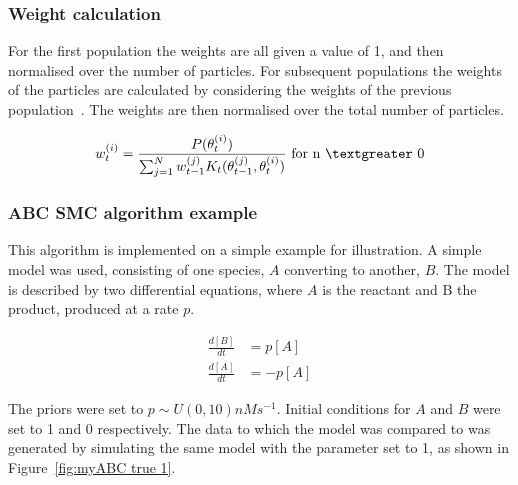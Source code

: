 \subsubsection{Weight calculation}
\label{sec:weight}
For the first population the weights are all given a value of 1, and then normalised over the number of particles. For subsequent populations the weights of the particles are calculated by considering the weights of the previous population~\autocite{Toni:2009tr}. The weights are then normalised over the total number of particles. 


\begin{align}
w_{t}^{(i)} = \frac{P(\theta_{t}^{(i)})}{\sum_{j=1}^N w_{t-1}^{(j)} K_{t}(\theta_{t-1}^{(j)}, \theta_{t}^{(i)})} \text{ for n $\textgreater$  0}
\end{align}
	
	
\subsubsection{ABC SMC algorithm example}	
This algorithm is implemented on a simple example for illustration. A simple model was used, consisting of one species, $A$ converting to another, $B$. The model is described by two differential equations, where $A$ is the reactant and B the product, produced at a rate $p$. 

\begin{align}
\frac{d[B]}{dt} &= p[A] \\ 
\frac{d[A]}{dt} &= -p[A] 
\end{align}

The priors were set to $p \sim U(0, 10)nM s^{-1}$. Initial conditions for $A$ and $B$ were set to 1 and 0 respectively. The data to which the model was compared to was generated by simulating the same model with the parameter set to 1, as shown in Figure~\ref{fig:myABC true 1}.


